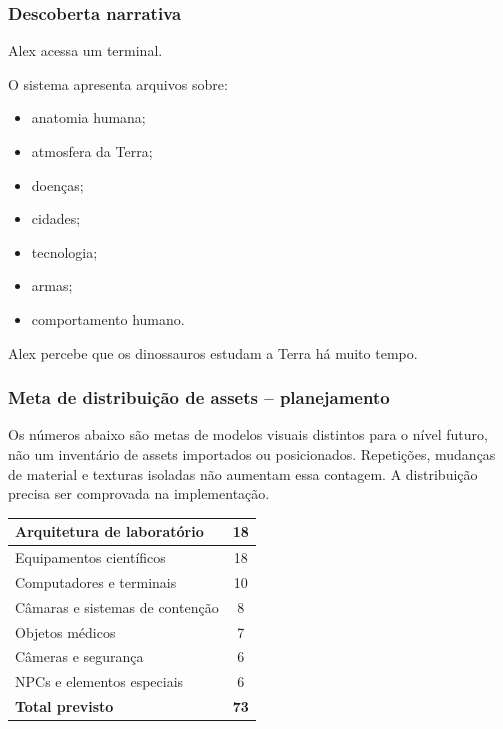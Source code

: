 \documentclass[12pt,a4paper]{article}
\begin{document}
\subsubsection*{Descoberta narrativa}

Alex acessa um terminal.

O sistema apresenta arquivos sobre:

\begin{itemize}
    \item anatomia humana;
    \item atmosfera da Terra;
    \item doenças;
    \item cidades;
    \item tecnologia;
    \item armas;
    \item comportamento humano.
\end{itemize}

Alex percebe que os dinossauros estudam a Terra há muito tempo.

\subsubsection*{Meta de distribuição de assets -- planejamento}

Os números abaixo são metas de modelos visuais distintos para o
nível futuro, não um inventário de assets importados ou posicionados.
Repetições, mudanças de material e texturas isoladas não aumentam
essa contagem. A distribuição precisa ser comprovada na implementação.


\begin{center}
\begin{tabularx}{\textwidth}{|X|c|}
\hline
Arquitetura de laboratório & 18\\
\hline
Equipamentos científicos & 18\\
\hline
Computadores e terminais & 10\\
\hline
Câmaras e sistemas de contenção & 8\\
\hline
Objetos médicos & 7\\
\hline
Câmeras e segurança & 6\\
\hline
NPCs e elementos especiais & 6\\
\hline
\textbf{Total previsto} & \textbf{73}\\
\hline
\end{tabularx}
\end{center}

\end{document}
